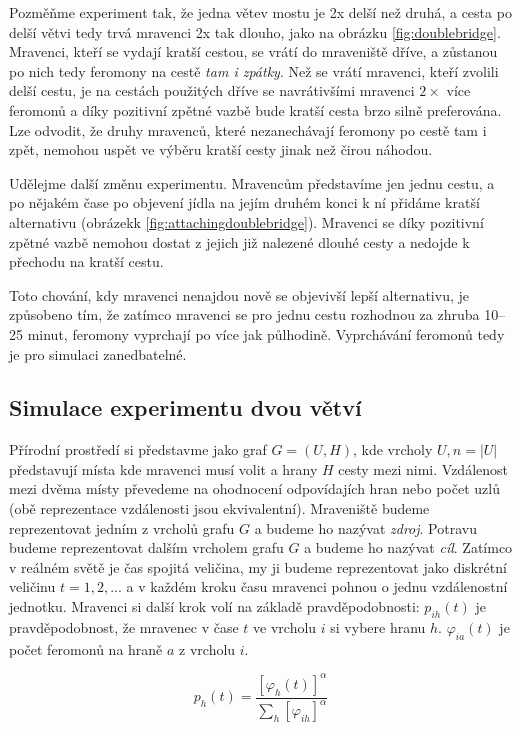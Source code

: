 \documentclass[12pt]{article}
\begin{document}
Pozmě\v{n}me experiment tak, že jedna větev mostu je 2x delší než druhá, a cesta po delší větvi tedy trvá mravenci 2x tak dlouho, jako na obrázku \ref{fig:doublebridge}. Mravenci, kteří se vydají kratší cestou, se vrátí do mraveniště dříve, a zůstanou po nich tedy feromony na cestě \emph{tam i zpátky}. Než se vrátí mravenci, kteří zvolili delší cestu, je na cestách použitých dříve se navrátivšími mravenci $2\times$ více feromonů a díky pozitivní zpětné vazbě bude kratší cesta brzo silně preferována. Lze odvodit, že druhy mravenců, které nezanechávají feromony po cestě tam i zpět, nemohou uspět ve výběru kratší cesty jinak než čirou náhodou.

Udělejme další změnu experimentu. Mravencům představíme jen jednu cestu, a po nějakém čase po objevení jídla na jejím druhém konci k ní přidáme kratší alternativu (obrázekk \ref{fig:attachingdoublebridge}). Mravenci se díky pozitivní zpětné vazbě nemohou dostat z jejich již nalezené dlouhé cesty a nedojde k přechodu na kratší cestu. \cite{goss1989}

Toto chování, kdy mravenci nenajdou nově se objevivší lepší alternativu, je způsobeno tím, že zatímco mravenci se pro jednu cestu rozhodnou za zhruba 10--25 minut, feromony vyprchají po více jak půlhodině. Vyprchávání feromonů tedy je pro simulaci zanedbatelné. \cite{deneubourg1989}

\subsection{Simulace experimentu dvou větví}
Přírodní prostředí si představme jako graf $G = (U, H)$, kde vrcholy $U, n = |U|$ představují místa kde mravenci musí volit a hrany $H$ cesty mezi nimi. Vzdálenost mezi dvěma místy převedeme na ohodnocení odpovídajích hran nebo počet uzlů (obě reprezentace vzdálenosti jsou ekvivalentní). Mraveniště budeme reprezentovat jedním z vrcholů grafu $G$ a budeme ho nazývat \emph{zdroj}. Potravu budeme reprezentovat dalším vrcholem grafu $G$ a budeme ho nazývat \emph{cíl}. Zatímco v reálném světě je čas spojitá veličina, my ji budeme reprezentovat jako diskrétní veličinu $t = 1, 2, ...$ a v každém kroku času mravenci pohnou o jednu vzdálenostní jednotku. Mravenci si další krok volí na základě pravděpodobnosti: $p_{ih}(t)$ je pravděpodobnost, že mravenec v čase $t$ ve vrcholu $i$ si vybere hranu $h$. $\varphi_{ia}(t)$ je počet feromonů na hraně $a$ z vrcholu $i$.

\begin{equation}\label{abstraktprob}
p_{h}(t)=\frac{\left[ \varphi_{h}(t) \right]^\alpha }{ \sum_{h} \left[ \varphi_{ih} \right]^\alpha}
 \end{equation}
 
\end{document}
